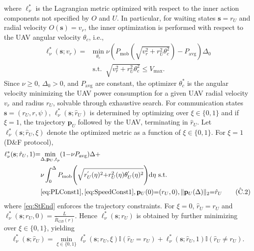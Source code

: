 \documentclass[10pt,twocolumn]{IEEEtran}
\begin{document}
where $\ell_{\nu}^{*}$ is the Lagrangian metric optimized with respect to the inner action components not specified by $O$ and $U$. In particular, for waiting states $\mathbf{s}{=}r_{U}$ and radial velocity $O(\mathbf{s}){=}v_{r}$, the inner optimization is performed with respect to the UAV angular velocity $\theta_{c}$, i.e.,
\begin{align}\label{eq:MinLWP}
	\ell_{\nu}^{*}(\mathbf{s}; v_r) = &\underset{\theta_c}{\mathrm{min}}\; \nu \left( P_{\mathrm{mob}}\left(\sqrt{v_{r}^2 + r_U^2\theta_c^2}\right) - P_{\mathrm{avg}} \right)\Delta_0\nonumber\\&\mathrm{s.t.}\;\; \sqrt{v_{r}^{2} + r_U^2\theta_c^2} \leq V_{\mathrm{max}}.
\end{align}
Since $\nu{\geq}0$, $\Delta_{0}{>}0$, and $P_{\mathrm{avg}}$ are constant, the optimizer $\theta_{c}^{*}$ is the angular velocity minimizing the UAV power consumption for a given UAV radial velocity $v_{r}$ and radius $r_{U}$, solvable through exhaustive search. For communication states $\mathbf{s}{=}(r_{U},r,\psi)$, $\ell_{\nu}^{*}(\mathbf{s};\hat{r}_{U})$ is determined by optimizing over $\xi{\in}\{0,1\}$ and if $\xi{=}1$, the trajectory $\mathbf{p}_{U}$ followed by the UAV, terminating in $\hat{r}_{U}$. Let $\ell_{\nu}^{*}(\mathbf{s};\hat{r}_{U},\xi)$ denote the optimized metric as a function of $\xi{\in}\{0,1\}$. For $\xi{=}1$ (D\&F protocol),
\begin{align}\label{eq:EllMin}
    \ell_{\nu}^{*}(\mathbf{s};\hat{r}_{U},1){=}&\underset{\Delta,\mathbf{p}_{U},t_{p}}{\mathrm{min}}(1{-}\nu P_{\mathrm{avg}})\Delta + \\&\nu\int_{0}^{\Delta}P_{\mathrm{mob}}\Bigg(\sqrt{r_{U}^{'}(\eta)^{2}{+}r_{U}^{2}(\eta)\theta_{U}^{'}(\eta)^{2}}\Bigg)\mathrm{d}\eta\text{ s.t. }\nonumber
    \\&\text{\ref{eq:PLConst1}},\text{\ref{eq:SpeedConst1}}\nonumber,\mathbf{p}_{U}(0){=}(r_{U},0),\Vert\mathbf{p}_{U}(\Delta)\Vert_{2}{=}\hat{r}_{U}\tag{$\hat{\text{C}}$.2}\label{eq:StEnd}
\end{align}
where \ref{eq:StEnd} enforces the trajectory constraints. For $\xi{=}0$, $\hat{r}_{U}{=}r_{U}$ and $\ell_{\nu}^{*}(\mathbf{s};r_{U},0){=}\frac{L}{\bar{R}_{GB}(r)}$. Hence $\ell_{\nu}^{*}(\mathbf{s};r_{U})$ is obtained by further minimizing over $\xi{\in}\{0,1\}$, yielding
\begin{align*}\label{ellnushatru}
	\ell_{\nu}^{*}(\mathbf{s};\hat{r}_{U}){=}\underset{\xi{\in}\{0,1\}}{\min}\ell_{\nu}^{*}(\mathbf{s};r_{U},\xi)\mathbb{I}(\hat{r}_{U}{=}r_{U}){+}\ell_{\nu}^{*}(\mathbf{s};\hat{r}_{U},1)\mathbb{I}(\hat{r}_{U}{\neq}{r}_{U}).
\end{align*}
\end{document}
